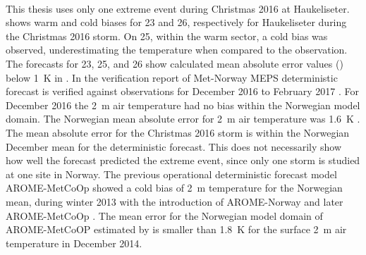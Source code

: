 \\
This thesis uses only one extreme event during Christmas 2016 at Haukeliseter. 
 shows warm and cold biases for \num{23} and \SI{26}{\dec}, respectively for Haukeliseter during the Christmas 2016 storm. On \SI{25}{\dec}, within the warm sector, a cold bias was observed, underestimating the temperature when compared to the observation. The forecasts for \num{23}, \num{25}, and \SI{26}{\dec} show calculated mean absolute error values () below \SIlist{1}{\kelvin} in . 
In the verification report of Met-Norway MEPS deterministic forecast is verified against observations for December 2016 to February 2017 \citep{homleid_verification_2016}. For December 2016 the \SI{2}{\metre} air temperature had no bias within the Norwegian model domain. The Norwegian mean absolute error for \SI{2}{\metre} air temperature was \SI{1.6}{\kelvin} \citep{homleid_verification_2016}. The mean absolute error for the Christmas 2016 storm is within the Norwegian December mean for the deterministic forecast. This does not necessarily show how well the forecast predicted the extreme event, since only one storm is studied at one site in Norway.
The previous operational deterministic forecast model AROME-MetCoOp showed a cold bias of \SI{2}{\metre} temperature for the Norwegian mean, during winter 2013 with the introduction of AROME-Norway and later AROME-MetCoOp \citep{muller_arome-metcoop:_2017}. 
The mean error for the Norwegian model domain of AROME-MetCoOP estimated by \citet{muller_arome-metcoop:_2017} is smaller than \SI{1.8}{\kelvin} for the surface \SI{2}{\metre} air temperature in December 2014. 
\\
